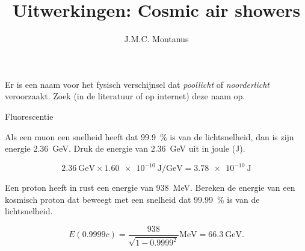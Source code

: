 

\title{Uitwerkingen: Cosmic air showers}
\author{J.M.C. Montanus}



\maketitle

\begin{questions}


\question Er is een naam voor het fysisch verschijnsel dat \emph{poollicht} of
\emph{noorderlicht} veroorzaakt. Zoek (in de literatuur of op internet)
deze naam op.
\begin{solution}
Fluorescentie
\end{solution}



\question Als een muon een snelheid heeft dat \SI{99.9}{\percent} is van de lichtsnelheid, dan
is zijn energie \SI{2.36}{\giga\electronvolt}. Druk de energie van
\SI{2.36}{\giga\electronvolt} uit in joule (\si{\joule}).
\begin{solution}
\begin{equation}
    \SI{2.36}{\giga\electronvolt} \times
    \SI{1.60e-10}{\joule\per\giga\electronvolt} = \SI{3.78e-10}{\joule}
    \nonumber
\end{equation}
\end{solution}

\question Een proton heeft in rust een energie van \SI{938}{\mega\electronvolt}.
Bereken de energie van een kosmisch proton dat beweegt met een snelheid
dat \SI{99.99}{\percent} is van de lichtsnelheid.
\begin{solution}
\begin{equation}
    E(\num{0.9999}c) = \frac{938}{\sqrt{1-\num{0.9999}^2}}\si{\mega\electronvolt}
    = \SI{66.3}{\giga\electronvolt}. \nonumber
\end{equation}
\end{solution}


\end{questions}
